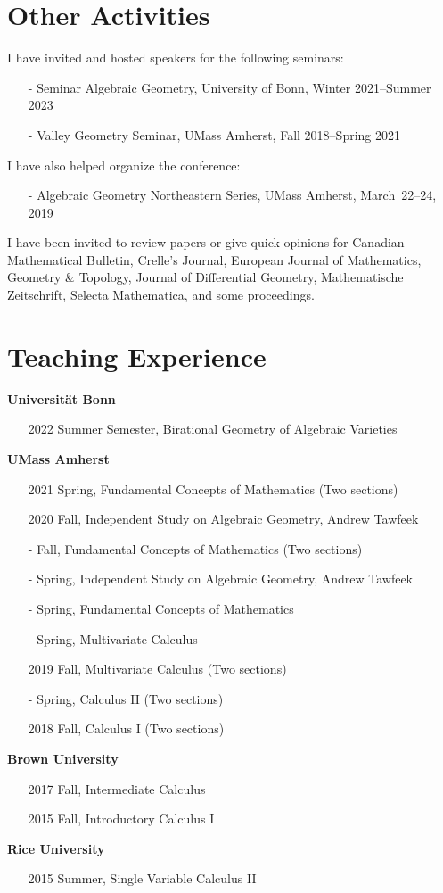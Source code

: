 \documentclass[12pt]{article}
\begin{document}
\section*{Other Activities}
I have invited and hosted speakers for the following seminars:
\begin{itemize}[leftmargin=!, itemsep=0pt]
	\item[-] Seminar Algebraic Geometry, University of Bonn, Winter 2021--Summer 2023
	\item[-] Valley Geometry Seminar, UMass Amherst, Fall 2018--Spring 2021
\end{itemize}
I have also helped organize the conference:
\begin{itemize}[leftmargin=!, itemsep=0pt]
	\item[-] Algebraic Geometry Northeastern Series, UMass Amherst, March~22--24, 2019
\end{itemize}

I have been invited to review papers or give quick opinions for Canadian Mathematical Bulletin, Crelle's Journal, European Journal of Mathematics, Geometry \& Topology, Journal of Differential Geometry, Mathematische Zeitschrift, Selecta Mathematica, and some proceedings.


\medskip
\section*{Teaching Experience}
\smallskip

{\bf Universit\"at Bonn}
\begin{itemize}[itemsep=0pt]
	\item[2022] Summer Semester, Birational Geometry of Algebraic Varieties
\end{itemize}
{\bf UMass Amherst}
\begin{itemize}[itemsep=0pt]
	\item[2021] Spring, Fundamental Concepts of Mathematics (Two sections)
	\item[2020] Fall, Independent Study on Algebraic Geometry, Andrew Tawfeek
	\item[-] Fall, Fundamental Concepts of Mathematics (Two sections)
	\item[-] Spring, Independent Study on Algebraic Geometry, Andrew Tawfeek
	\item[-] Spring, Fundamental Concepts of Mathematics
	\item[-] Spring, Multivariate Calculus
	\item[2019] Fall, Multivariate Calculus (Two sections)
	\item[-] Spring, Calculus II (Two sections)
	\item[2018] Fall, Calculus I (Two sections)
\end{itemize}
{\bf Brown University}
\begin{itemize}[itemsep=0pt]
	\item[2017] Fall, Intermediate Calculus
	\item[2015] Fall, Introductory Calculus I
\end{itemize}
{\bf Rice University}
\begin{itemize}[itemsep=0pt]
	\item[2015] Summer, Single Variable Calculus II
\end{itemize}
\end{document}
